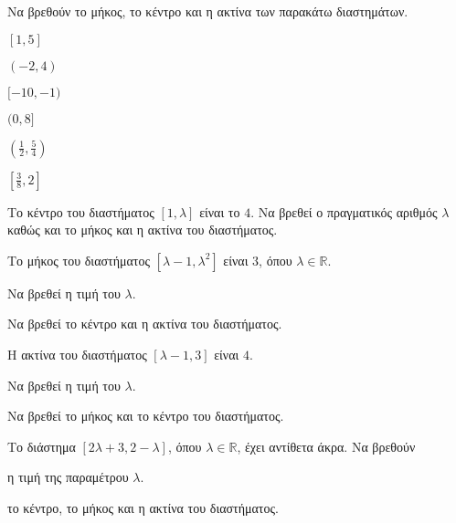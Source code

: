 \documentclass[11pt,a4paper]{article}
\begin{document}
Να βρεθούν το μήκος, το κέντρο και η ακτίνα των παρακάτω διαστημάτων.
\begin{multicols}{2}
\begin{alist}
\item $ [1,5] $
\item $ (-2,4) $
\item $ [-10,-1) $
\item $ (0,8] $
\item $ \left(\frac{1}{2},\frac{5}{4}\right) $
\item $ \left[\frac{3}{8},2\right] $
\end{alist}
\end{multicols}



Το κέντρο του διαστήματος $ [1,\lambda] $ είναι το $ 4 $. Να βρεθεί ο πραγματικός αριθμός $ \lambda $ καθώς και το μήκος και η ακτίνα του διαστήματος.




Το μήκος του διαστήματος $ [\lambda-1,\lambda^2] $ είναι $ 3 $, όπου $ \lambda\in\mathbb{R} $.
\begin{alist}
\item Να βρεθεί η τιμή του $ \lambda $.
\item Να βρεθεί το κέντρο και η ακτίνα του διαστήματος.
\end{alist}



Η ακτίνα του διαστήματος $ [\lambda-1,3] $ είναι $ 4 $.
\begin{alist}
\item Να βρεθεί η τιμή του $ \lambda $.
\item Να βρεθεί το μήκος και το κέντρο του διαστήματος.
\end{alist}



Το διάστημα $ [2\lambda+3,2-\lambda] $, όπου $ \lambda\in\mathbb{R} $, έχει αντίθετα άκρα. Να βρεθούν 
\begin{alist}
\item η τιμή της παραμέτρου $ \lambda $.
\item το κέντρο, το μήκος και η ακτίνα του διαστήματος.
\end{alist}
\end{document}
